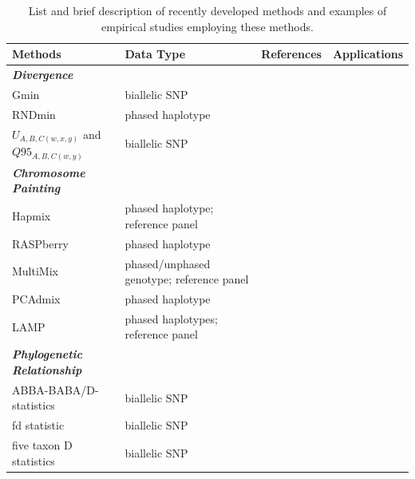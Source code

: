 \documentclass[11pt]{article}
\begin{document}
	
	



\begin{table}[b]

\begin{center}
\caption{List and brief description of recently developed methods and examples of empirical studies employing these methods.} \label{tab:tools}
\begin{tabularx}{\textwidth}{llll}
\\\toprule  
\rowcolor{white}
{\bf Methods}	& {\bf Data Type } &	{\bf References} &  {\bf Applications } \\ \midrule

\rowcolor{gray!25}
{\emph{\bf Divergence}} &   &   &   \\
\rowcolor{gray!25}
Gmin &	biallelic SNP	&  \cite{geneva2015}	 &  \cite{kingan2015}\\
\rowcolor{gray!25}
RNDmin	& phased haplotype	& \cite{rosenzweig2016} &  \cite{roda2017} \\
\rowcolor{gray!25}
$U_{A,B,C(w,x,y)}$ and $Q95_{A,B,C(w,y)}$ & biallelic SNP & \cite{Racimo2015} & \cite{sams2016} \\

\rowcolor{white}
{\emph{\bf Chromosome Painting}} &   &   &   \\
\rowcolor{white}
Hapmix	& phased haplotype; reference panel		& \cite{Price2009}	&  \cite{Hufford2013, suarez2016} \\ 
\rowcolor{white}
RASPberry &	phased haplotype &	\cite{wegmann2011}	 & \cite{christe2016} \\
\rowcolor{white}
MultiMix & phased/unphased genotype; reference panel &	\cite{churchhouse2013} &	\cite{eyheramendy2015} \\
\rowcolor{white}
PCAdmix	 & phased haplotype	 & \cite{brisbin2012pcadmix}	 &  \cite{pugach2016complex, moreno2014genetics} \\
\rowcolor{white}
LAMP  &	phased haplotypes; reference panel	 & \cite{sankararaman2008}	 & \cite{patterson2012} \\

\rowcolor{gray!25}
{\emph{\bf Phylogenetic Relationship}} &   &   &   \\
\rowcolor{gray!25}
ABBA-BABA/D-statistics	 & biallelic SNP  &	\cite{durand2011}	 &  \cite{heliconius2012} \\
\rowcolor{gray!25}
fd statistic &	biallelic SNP &	\cite{martin2015}  &	\cite{malinsky2015, zhang2016genome} \\ 
\rowcolor{gray!25}
five taxon D statistics	& biallelic SNP	&  \cite{pease2015}	& \cite{fontaine2015, pease2016} \\


\end{tabularx}
\end{center}
\end{table} 
\end{document}
